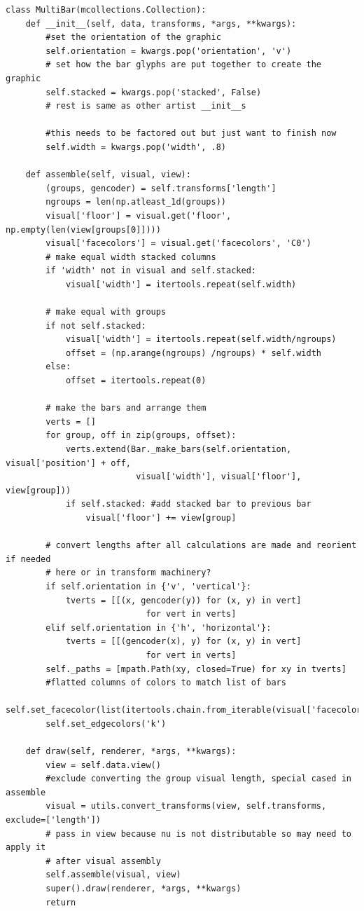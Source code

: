 \documentclass[../main.tex]{subfiles}
\begin{document}
\begin{verbatim}
class MultiBar(mcollections.Collection):
    def __init__(self, data, transforms, *args, **kwargs):
        #set the orientation of the graphic  
        self.orientation = kwargs.pop('orientation', 'v')
        # set how the bar glyphs are put together to create the graphic
        self.stacked = kwargs.pop('stacked', False)     
        # rest is same as other artist __init__s

        #this needs to be factored out but just want to finish now
        self.width = kwargs.pop('width', .8)
       
    def assemble(self, visual, view):
        (groups, gencoder) = self.transforms['length']
        ngroups = len(np.atleast_1d(groups))
        visual['floor'] = visual.get('floor', np.empty(len(view[groups[0]])))
        visual['facecolors'] = visual.get('facecolors', 'C0')
        # make equal width stacked columns 
        if 'width' not in visual and self.stacked:
            visual['width'] = itertools.repeat(self.width)

        # make equal with groups
        if not self.stacked:
            visual['width'] = itertools.repeat(self.width/ngroups)
            offset = (np.arange(ngroups) /ngroups) * self.width
        else:
            offset = itertools.repeat(0)
        
        # make the bars and arrange them 
        verts = []
        for group, off in zip(groups, offset):
            verts.extend(Bar._make_bars(self.orientation, visual['position'] + off, 
                          visual['width'], visual['floor'], view[group]))
            if self.stacked: #add stacked bar to previous bar
                visual['floor'] += view[group]
          
        # convert lengths after all calculations are made and reorient if needed
        # here or in transform machinery?
        if self.orientation in {'v', 'vertical'}:
            tverts = [[(x, gencoder(y)) for (x, y) in vert] 
                            for vert in verts]
        elif self.orientation in {'h', 'horizontal'}:
            tverts = [[(gencoder(x), y) for (x, y) in vert] 
                            for vert in verts]
        self._paths = [mpath.Path(xy, closed=True) for xy in tverts]
        #flatted columns of colors to match list of bars
        self.set_facecolor(list(itertools.chain.from_iterable(visual['facecolors'])))
        self.set_edgecolors('k')
        
    def draw(self, renderer, *args, **kwargs):
        view = self.data.view()
        #exclude converting the group visual length, special cased in assemble
        visual = utils.convert_transforms(view, self.transforms, exclude=['length'])
        # pass in view because nu is not distributable so may need to apply it 
        # after visual assembly
        self.assemble(visual, view)
        super().draw(renderer, *args, **kwargs)
        return      
\end{verbatim}
\end{document}
